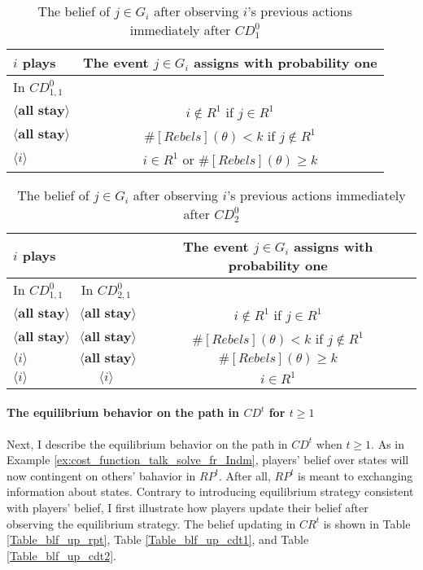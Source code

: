\documentclass[12pt,letter]{article}
\theoremstyle{definition}
\theoremstyle{remark}
\theoremstyle{claim}
\begin{document}
\begin{table}[!htbp]
\caption{The belief of $j\in G_i$ after observing $i$'s previous actions immediately after $CD^0_{1}$}
\label{Table_blf_up_cd01}
\begin{center}
\begin{tabular}{l | c}
 	$i$ plays	  				  &  The event $j\in G_i$ assigns with probability one\\
\hline
\hline
In $CD^0_{1,1}$	&				  \\
\hline
  $\langle \textbf{all stay} \rangle$	&    $i\notin R^1$ if $j\in R^1$ \\
  $\langle \textbf{all stay} \rangle$	&    $\#[Rebels](\theta)< k$ if $j\notin R^1$\\
  $\langle i \rangle$	&	  $i\in R^1$ or $\#[Rebels](\theta)\geq k$    \\
  \hline
\end{tabular}
\end{center}
\end{table}

\begin{table}[!htbp]
\caption{The belief of $j\in G_i$ after observing $i$'s previous actions immediately after $CD^0_{2}$}
\label{Table_blf_up_cd02}
\begin{center}
\begin{tabular}{l  c | c}
 	$i$ plays	  	&  	  &The event $j\in G_i$ assigns with probability one \\
\hline
\hline
	In $CD^0_{1,1}$		&			In $CD^0_{2,1}$	&  \\
\hline
  $\langle \textbf{all stay} \rangle$	&  $\langle \textbf{all stay} \rangle$ &  $i\notin R^1$ if $j\in R^1$ \\
  $\langle \textbf{all stay} \rangle$	&  $\langle \textbf{all stay} \rangle$ &  $\#[Rebels](\theta)< k$ if $j\notin R^1$\\
  $\langle i \rangle$	&	$\langle \textbf{all stay} \rangle$ &  $\#[Rebels](\theta)\geq k$    \\
  $\langle i \rangle$	&	$\langle i \rangle$ &  $i\in R^1$  \\
  \hline
\end{tabular}
\end{center}
\end{table}

\clearpage

\paragraph{The equilibrium behavior on the path in $CD^t$ for $t\geq 1$}
Next, I describe the equilibrium behavior on the path in $CD^t$ when $t\geq 1$. As in Example \ref{ex:cost_function_talk_solve_fr_Indm}, players' belief over states will now contingent on others' bahavior in $RP^t$. After all, $RP^t$ is meant to exchanging information about states. Contrary to introducing equilibrium strategy consistent with players' belief, I first illustrate how players update their belief after observing the equilibrium strategy. The belief updating in $CR^t$ is  shown in Table \ref{Table_blf_up_rpt}, Table \ref{Table_blf_up_cdt1}, and Table \ref{Table_blf_up_cdt2}.
\end{document}
